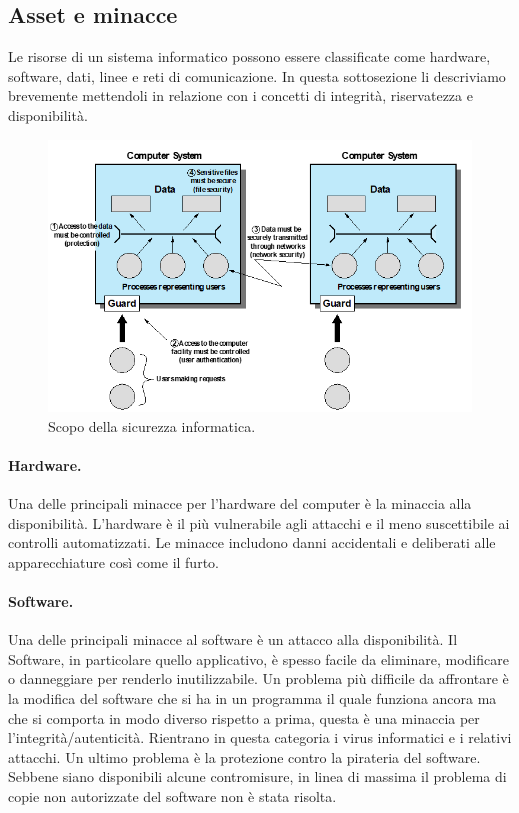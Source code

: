 \subsection{Asset e minacce}

Le risorse di un sistema informatico possono essere classificate come hardware,
software, dati, linee e reti di comunicazione. In questa sottosezione li
descriviamo brevemente mettendoli in relazione con i concetti di integrità,
riservatezza e disponibilità.

\begin{figure}[H]
      \centering
      \includegraphics[width=14cm, keepaspectratio]{capitoli/cap_1/imgs/asset_sec.png}
      \caption{ Scopo della sicurezza informatica.}\label{fig:asset_sec}
\end{figure}

\paragraph{Hardware.}
Una delle principali minacce per l'hardware  del computer è la minaccia alla
disponibilità. L'hardware è il più vulnerabile agli attacchi e il meno
suscettibile ai controlli automatizzati. Le minacce includono danni accidentali
e deliberati alle apparecchiature così come il furto.


\paragraph{Software.}
Una delle principali minacce al software è un attacco alla disponibilità.
Il Software, in particolare quello applicativo, è spesso facile da eliminare,
modificare o danneggiare per renderlo inutilizzabile.
Un problema più difficile da affrontare è la modifica del software che si ha in
un programma il quale funziona ancora ma che si comporta in modo diverso rispetto
a prima, questa è una minaccia per l'integrità/autenticità.
Rientrano in questa categoria i virus informatici e i relativi attacchi.
Un ultimo problema è la protezione contro la pirateria del software.
Sebbene siano disponibili alcune contromisure, in linea di massima il problema
di copie non autorizzate del software non è stata risolta.

